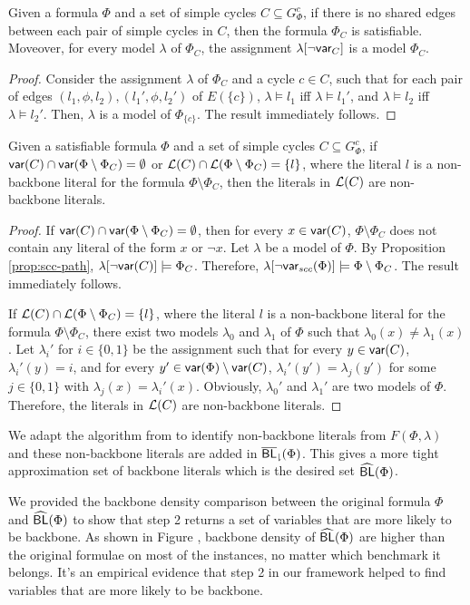 \begin{proposition}\label{prop:scc-path}
Given a formula $\Phi$ and a set of simple cycles $C\subseteq G_\Phi^{c}$,
if there is no shared edges between each pair of simple cycles in $C$,
then the formula $\Phi_{C}$ is satisfiable. Moveover, for every model $\lambda$ of $\Phi_{C}$,
the assignment $\lambda[\neg \textsf{var}_{C}]$ is a model $\Phi_C$.
\end{proposition}

\begin{proof}
Consider the assignment $\lambda$ of $\Phi_{C}$ and a cycle $c\in C$, such that for each pair of edges $(l_1,\phi,l_2),(l_1',\phi,l_2')$ of $E(\{c\})$,
$\lambda\models l_1$ iff $\lambda\models l_1'$, and $\lambda\models l_2$ iff $\lambda\models l_2'$.
Then, $\lambda$ is a model of $\Phi_{\{c\}}$. The result immediately follows.
\end{proof}

\begin{lemma}
Given a satisfiable formula $\Phi$ and a set of simple cycles $C\subseteq G_\Phi^{c}$, if $\textsf{var}(C)\cap \textsf{var}(\Phi\setminus\Phi_{C})=\emptyset$ or ${\cal L}(C)\cap {\cal L}(\Phi\setminus\Phi_C)=\{l\}$, where the literal $l$ is a non-backbone literal for the formula $\Phi\setminus\Phi_C$, then the literals in ${\cal L}(C)$ are non-backbone literals.
\end{lemma}

\begin{proof}
If $\textsf{var}(C)\cap \textsf{var}(\Phi\setminus\Phi_{C})=\emptyset$, then for every $x\in\textsf{var}(C)$, $\Phi\setminus\Phi_C$ does not contain any
literal of the form $x$ or $\neg x$. Let $\lambda$ be a model of $\Phi$.
By Proposition \ref{prop:scc-path}, $\lambda[\neg\textsf{var}(C)]\models\Phi_C$.
Therefore, $\lambda[\neg\textsf{var}_{scc}(\Phi) ]\models\Phi\setminus\Phi_C$.
The result immediately follows.

If ${\cal L}(C)\cap {\cal L}(\Phi\setminus\Phi_C)=\{l\}$, where the literal $l$ is a non-backbone literal for the formula $\Phi\setminus\Phi_C$,
there exist two models $\lambda_0$ and $\lambda_1$ of $\Phi$ such that $\lambda_0(x)\neq \lambda_1(x)$.
Let $\lambda_i'$ for $i\in\{0,1\}$ be the assignment such that
for every $y\in\textsf{var}(C)$, $\lambda_i'(y)=i$, and for every $y'\in \textsf{var}(\Phi)\setminus\textsf{var}(C)$,
$\lambda_i'(y')=\lambda_j(y')$ for some $j\in\{0,1\}$ with $\lambda_j(x)=\lambda_i'(x)$.
Obviously, $\lambda_0'$ and $\lambda_1'$ are two models of $\Phi$. Therefore,
the literals in ${\cal L}(C)$ are non-backbone literals.
\end{proof}

We adapt the algorithm from \cite{Jon75} to identify non-backbone literals from $F(\Phi,\lambda)$ and these non-backbone literals are added in ${\sf \overline{BL}_\downharpoonright}(\Phi)$.
This gives a more tight approximation set of backbone literals which is the desired set ${\sf \widehat{BL}}(\Phi)$.


We provided the backbone density comparison between the original formula $\Phi$ and ${\sf \widehat{BL}}(\Phi)$ to show that step 2 returns a set of variables that are more likely to be backbone.
As shown in Figure , backbone density of ${\sf \widehat{BL}}(\Phi)$ are higher than the original formulae on most of the instances, no matter which benchmark it belongs. It's an empirical evidence that step 2 in our framework helped to find variables that are more likely to be backbone. 